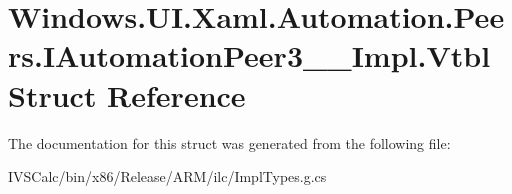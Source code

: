 \hypertarget{struct_windows_1_1_u_i_1_1_xaml_1_1_automation_1_1_peers_1_1_i_automation_peer3_____impl_1_1_vtbl}{}\section{Windows.\+U\+I.\+Xaml.\+Automation.\+Peers.\+I\+Automation\+Peer3\+\_\+\+\_\+\+Impl.\+Vtbl Struct Reference}
\label{struct_windows_1_1_u_i_1_1_xaml_1_1_automation_1_1_peers_1_1_i_automation_peer3_____impl_1_1_vtbl}


The documentation for this struct was generated from the following file\+:\begin{DoxyCompactItemize}
\item 
I\+V\+S\+Calc/bin/x86/\+Release/\+A\+R\+M/ilc/Impl\+Types.\+g.\+cs\end{DoxyCompactItemize}

